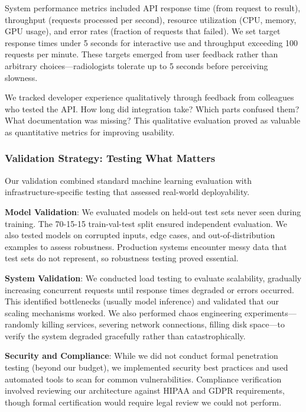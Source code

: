 \documentclass[12pt,a4paper]{article}
\begin{document}
System performance metrics included API response time (from request to result), throughput (requests processed per second), resource utilization (CPU, memory, GPU usage), and error rates (fraction of requests that failed). We set target response times under 5 seconds for interactive use and throughput exceeding 100 requests per minute. These targets emerged from user feedback rather than arbitrary choices—radiologists tolerate up to 5 seconds before perceiving slowness.

We tracked developer experience qualitatively through feedback from colleagues who tested the API. How long did integration take? Which parts confused them? What documentation was missing? This qualitative evaluation proved as valuable as quantitative metrics for improving usability.

\subsubsection{Validation Strategy: Testing What Matters}

Our validation combined standard machine learning evaluation with infrastructure-specific testing that assessed real-world deployability.

\textbf{Model Validation}: We evaluated models on held-out test sets never seen during training. The 70-15-15 train-val-test split ensured independent evaluation. We also tested models on corrupted inputs, edge cases, and out-of-distribution examples to assess robustness. Production systems encounter messy data that test sets do not represent, so robustness testing proved essential.

\textbf{System Validation}: We conducted load testing to evaluate scalability, gradually increasing concurrent requests until response times degraded or errors occurred. This identified bottlenecks (usually model inference) and validated that our scaling mechanisms worked. We also performed chaos engineering experiments—randomly killing services, severing network connections, filling disk space—to verify the system degraded gracefully rather than catastrophically.

\textbf{Security and Compliance}: While we did not conduct formal penetration testing (beyond our budget), we implemented security best practices and used automated tools to scan for common vulnerabilities. Compliance verification involved reviewing our architecture against HIPAA and GDPR requirements, though formal certification would require legal review we could not perform.
\end{document}
